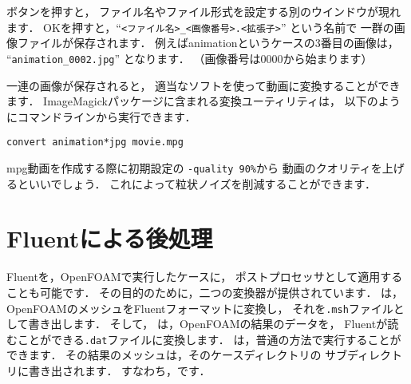 ボタンを押すと，
ファイル名やファイル形式を設定する別のウインドウが現れます．
OKを押すと，``\verb|<ファイル名>_<画像番号>.<拡張子>|'' という名前で
一群の画像ファイルが保存されます．
例えばanimationというケースの3番目の画像は，
``\verb|animation_0002.jpg|'' となります．
（画像番号は0000から始まります）

一連の画像が保存されると，
適当なソフトを使って動画に変換することができます．
ImageMagickパッケージに含まれる変換ユーティリティは，
以下のようにコマンドラインから実行できます．
\begin{OFterminal}
\begin{verbatim}
convert animation*jpg movie.mpg
\end{verbatim}
\end{OFterminal}
mpg動画を作成する際に初期設定の \verb|-quality 90%|から
動画のクオリティを上げるといいでしょう．
これによって粒状ノイズを削減することができます．



\section{Fluentによる後処理}
\label{sec:6.2}
Fluentを，OpenFOAMで実行したケースに，
ポストプロセッサとして適用することも可能です．
その目的のために，二つの変換器が提供されています．
%
%
は，
OpenFOAMのメッシュをFluentフォーマットに変換し，
それを\texttt{.msh}ファイルとして書き出します．
そして，
%
%
は，OpenFOAMの結果のデータを，
Fluentが読むことができる\texttt{.dat}ファイルに変換します．
は，普通の方法で実行することができます．
その結果のメッシュは，そのケースディレクトリの
%
%
サブディレクトリに書き出されます．
すなわち，です．

